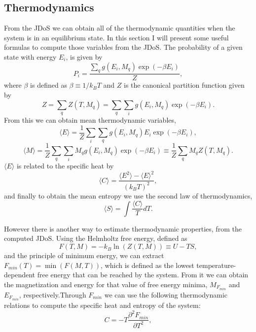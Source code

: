 \subsection{Thermodynamics}

From the JDoS we can obtain all of the thermodynamic quantities when the system is in an equilibrium state. In this section I will present some useful formulas to compute those variables from the JDoS. 
The probability of a given state with energy $E_i$, is given by
\begin{equation}
	P_i = \frac{\sum_q g(E_i, M_q) \exp(-\beta E_i)}{Z},
\end{equation}
where $\beta$ is defined as $\beta \equiv 1/k_BT$ and $Z$ is the canonical partition function given by
\begin{equation}
	Z = \sum_q Z(T, M_q) = \sum_q \sum_i g(E_i, M_q) \exp(-\beta E_i).
\end{equation}
From this we can obtain mean thermodynamic variables, 
\begin{equation}
	\langle E \rangle = \frac{1}{Z} \sum_i \sum_q  g(E_i, M_q) E_i \exp(-\beta E_i),
\end{equation}
\begin{equation}
	\langle M \rangle  = \frac{1}{Z} \sum_q \sum_i M_q g(E_i, M_q) \exp(-\beta E_i) \equiv \frac{1}{Z} \sum_q M_q Z(T, M_q).
\end{equation}
$\langle E \rangle$ is related to the specific heat by 
\begin{equation}
	\langle C \rangle = \frac{\langle E^2 \rangle - \langle E \rangle^2}{\left( k_BT \right)^2},
\end{equation}
and finally to obtain the mean entropy we use the second law of thermodynamics,
\begin{equation}
	\langle S \rangle= \int \frac{\langle C \rangle}{T} dT.
\end{equation}

\pagebreak

However there is another way to estimate thermodynamic properties, from the computed JDoS.  Using the Helmholtz free energy, defined as 
\begin{equation}
	F(T, M) = - k_B \ln(Z(T, M)) \equiv U - TS,
\end{equation}
and the principle of minimum energy, we can extract $F_{min} (T) = \min(F(M, T))$, which is defined as the lowest temperature-dependent free energy that can be reached by the system.
From it we can obtain the magnetization and energy for that value of free energy minima, $M_{F_{min}}$ and $E_{F_{min}}$, respectively.Through $F_{min}$ we can use the following thermodynamic relations to compute the specific heat and entropy of the system:
\begin{equation}\label{C_min}
	C = - T \frac{\partial^2 F_{min}}{\partial T^2},
\end{equation}

